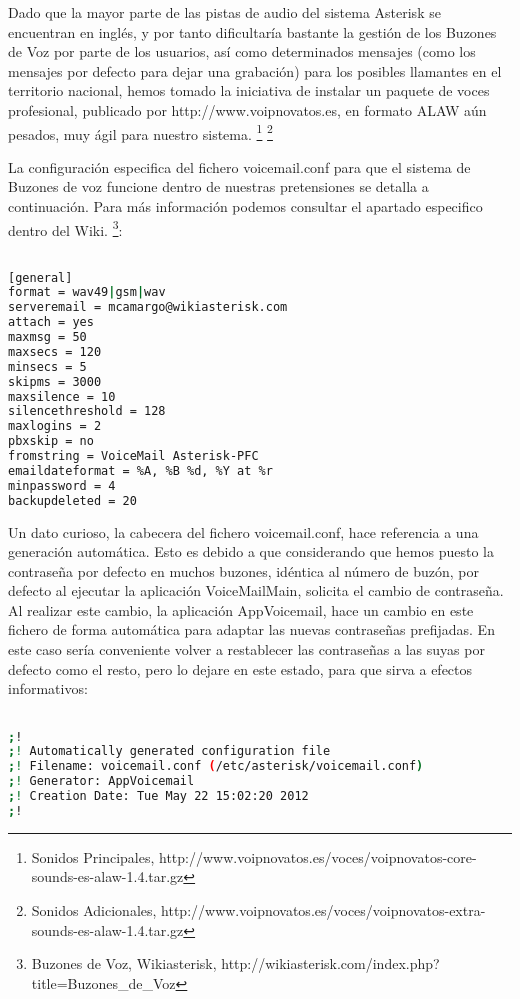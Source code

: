 Dado que la mayor parte de las pistas de audio del sistema Asterisk se encuentran en inglés, y por tanto dificultaría bastante la gestión de los Buzones de Voz por parte de los usuarios, así como determinados mensajes (como los mensajes por defecto para dejar una grabación) para los posibles llamantes en el territorio nacional, hemos tomado la iniciativa de instalar un paquete de voces profesional, publicado por http://www.voipnovatos.es, en formato ALAW aún pesados, muy ágil para nuestro sistema. \footnote{Sonidos Principales, http://www.voipnovatos.es/voces/voipnovatos-core-sounds-es-alaw-1.4.tar.gz} \footnote{Sonidos Adicionales, http://www.voipnovatos.es/voces/voipnovatos-extra-sounds-es-alaw-1.4.tar.gz}

La configuración especifica del fichero voicemail.conf para que el sistema de Buzones de voz funcione dentro de nuestras pretensiones se detalla a continuación. Para más información podemos consultar el apartado especifico dentro del Wiki. \footnote{Buzones de Voz, Wikiasterisk, http://wikiasterisk.com/index.php?title=Buzones\_de\_Voz}:

\begin{lstlisting}[language=bash,title={/etc/asterisk/voicemail.conf}]

[general]
format = wav49|gsm|wav
serveremail = mcamargo@wikiasterisk.com
attach = yes
maxmsg = 50
maxsecs = 120
minsecs = 5
skipms = 3000
maxsilence = 10
silencethreshold = 128
maxlogins = 2
pbxskip = no
fromstring = VoiceMail Asterisk-PFC
emaildateformat = %A, %B %d, %Y at %r
minpassword = 4
backupdeleted = 20

\end{lstlisting}

Un dato curioso, la cabecera del fichero voicemail.conf, hace referencia a una generación automática. Esto es debido a que considerando que hemos puesto la contraseña por defecto en muchos buzones, idéntica al número de buzón, por defecto al ejecutar la aplicación VoiceMailMain, solicita el cambio de contraseña. Al realizar este cambio, la aplicación AppVoicemail, hace un cambio en este fichero de forma automática para adaptar las nuevas contraseñas prefijadas. En este caso sería conveniente volver a restablecer las contraseñas a las suyas por defecto como el resto, pero lo dejare en este estado, para que sirva a efectos informativos:

\begin{lstlisting}[language=bash,title={/etc/asterisk/voicemail.conf}]

;!
;! Automatically generated configuration file
;! Filename: voicemail.conf (/etc/asterisk/voicemail.conf)
;! Generator: AppVoicemail
;! Creation Date: Tue May 22 15:02:20 2012
;!

\end{lstlisting}

